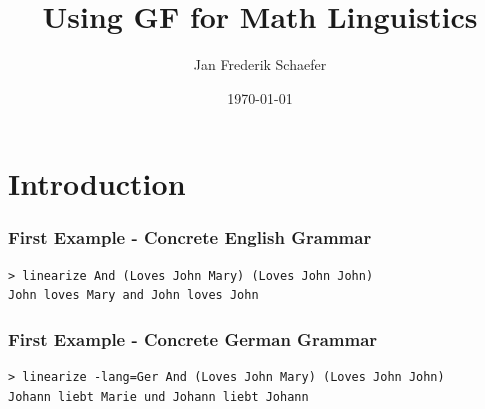 \documentclass{beamer}
\title{Using GF for Math Linguistics}
\author{Jan Frederik Schaefer}
\date{\today}
\begin{document}
\frame{\titlepage} 

\section{Introduction}



\begin{frame}[fragile]
    \frametitle{First Example - Concrete English Grammar}

    

    \vspace{2em}
\begin{lstlisting}[language=GFcmd, breaklines=true]
> linearize And (Loves John Mary) (Loves John John)
John loves Mary and John loves John
\end{lstlisting}
\end{frame}

\begin{frame}[fragile]
    \frametitle{First Example - Concrete German Grammar}

    

    \vspace{2em}
\begin{lstlisting}[language=GFcmd, breaklines=true]
> linearize -lang=Ger And (Loves John Mary) (Loves John John)
Johann liebt Marie und Johann liebt Johann
\end{lstlisting}
\end{frame}
\end{document}
